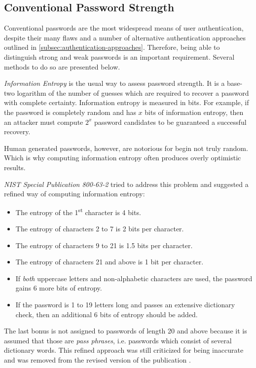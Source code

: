 \subsection{Conventional Password Strength}
\label{subsec:password-strength}

Conventional passwords are the most widespread means of user authentication, despite their many flaws and a number of alternative authentication approaches outlined in \ref{subsec:authentication-approaches}. Therefore, being able to distinguish strong and weak passwords is an important requirement. Several methods to do so are presented below.

\emph{Information Entropy} is the usual way to assess password strength. It is a base-two logarithm of the number of guesses which are required to recover a password with complete certainty. Information entropy is measured in bits. For example, if the password is completely random and has \(x\) bits of information entropy, then an attacker must compute \(2^x\) password candidates to be guaranteed a successful recovery.

Human generated passwords, however, are notorious for begin not truly random. Which is why computing information entropy often produces overly optimistic results.

\emph{NIST Special Publication 800-63-2} \cite{burr2013electronic} tried to address this problem and suggested a refined way of computing information entropy:

\begin{itemize}
    \item The entropy of the 1\textsuperscript{st} character is 4 bits.
    \item The entropy of characters 2 to 7 is 2 bits per character.
    \item The entropy of characters 9 to 21 is 1.5 bits per character.
    \item The entropy of characters 21 and above is 1 bit per character.
    \item If \emph{both} uppercase letters and non-alphabetic characters are used, the password gains 6 more bits of entropy.
    \item If the password is 1 to 19 letters long and passes an extensive dictionary check, then an additional 6 bits of entropy should be added.
  \end{itemize}

The last bonus is not assigned to passwords of length 20 and above because it is assumed that those are \emph{pass phrases}, i.e. passwords which consist of several dictionary words. This refined approach was still criticized for being inaccurate and was removed from the revised version of the publication \cite{grassi2017digital}.

